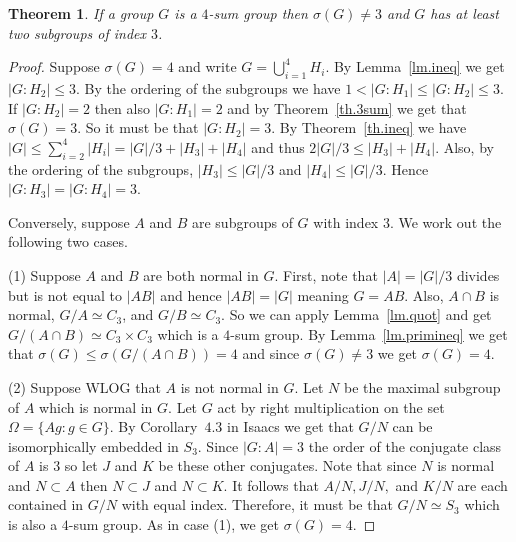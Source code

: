 \documentclass[12pt]{amsart}
\newtheorem{theorem}{Theorem}
\theoremstyle{definition}
\theoremstyle{remark}
\begin{document}
\begin{theorem}
\label{th.4sum}
If a group \( G \) is a \(4\)-sum group then \( \sigma(G) \neq 3 \) and \( G \) has at least two subgroups of index \( 3 \).
\end{theorem}
\begin{proof}
Suppose \( \sigma(G) = 4 \) and write \( G = \bigcup_{i=1}^4 H_i \).  By Lemma~\ref{lm.ineq} we get \( |G:H_2| \leq 3 \).  By the ordering of the subgroups we have \( 1 < |G:H_1| \leq |G:H_2| \leq 3 \).  If \( |G:H_2| = 2 \) then also \( |G:H_1| = 2 \) and by Theorem~\ref{th.3sum} we get that \( \sigma(G) = 3 \).  So it must be that \( |G:H_2| = 3 \).  By Theorem~\ref{th.ineq} we have \( |G| \leq \sum_{i=2}^4 |H_i| = |G|/3 + |H_3| + |H_4| \) and thus \( 2|G|/3 \leq |H_3| + |H_4| \).  Also, by the ordering of the subgroups, \( |H_3| \leq |G|/3 \) and \( |H_4| \leq |G|/3 \).  Hence \( |G:H_3| = |G:H_4| = 3 \).

Conversely, suppose \( A \) and \( B \) are subgroups of \( G \) with index \( 3 \).  We work out the following two cases.

(1) Suppose \( A \) and \(B\) are both normal in \( G \).  First, note that \( |A| = |G|/3 \) divides but is not equal to \( |AB| \) and hence \( |AB| = |G| \) meaning \( G = AB \).  Also, \( A \cap B \) is normal, \( G/A \simeq C_3 \), and \( G/B \simeq C_3 \).  So we can apply Lemma~\ref{lm.quot} and get \( G/(A \cap B) \simeq C_3 \times C_3 \) which is a \(4\)-sum group.  By Lemma~\ref{lm.primineq} we get that \( \sigma(G) \leq \sigma(G/(A \cap B)) = 4 \) and since \( \sigma(G) \neq 3 \) we get \( \sigma(G) = 4 \).

(2) Suppose WLOG that \( A \) is not normal in \( G \).  Let \( N \) be the maximal subgroup of \( A \) which is normal in \( G \).  Let \( G \) act by right multiplication on the set \( \Omega = \{ Ag: g \in G \} \).  By Corollary~\(4.3\) in Isaacs \cite{IMIs94} we get that \( G/N \) can be isomorphically embedded in \( S_3 \).  Since \( |G:A| = 3 \) the order of the conjugate class of \( A \) is \( 3 \) so let \( J \) and \( K \) be these other conjugates.  Note that since \( N \) is normal and \( N \subset A \) then \( N \subset J \) and \( N \subset K \).  It follows that \( A/N, J/N, \) and \( K/N \) are each contained in \( G/N \) with equal index.  Therefore, it must be that \( G/N \simeq S_3 \) which is also a \(4\)-sum group.  As in case (1), we get \( \sigma(G) = 4 \).
\end{proof}
\end{document}

